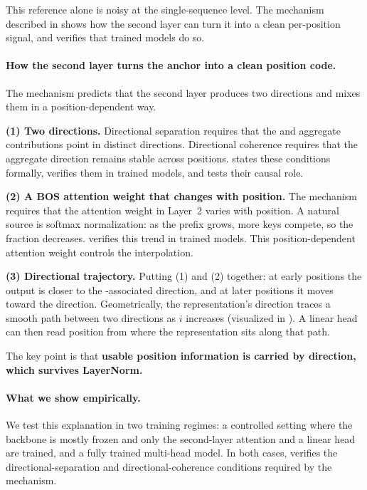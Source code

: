 \documentclass{article}
\theoremstyle{plain}
\theoremstyle{definition}
\theoremstyle{remark}
\begin{document}
This reference alone is noisy at the single-sequence level.
The mechanism described in  shows how the second layer can turn it into a clean per-position signal, and  verifies that trained models do so.

\paragraph{How the second layer turns the anchor into a clean position code.}
The mechanism predicts that the second layer produces two directions and mixes them in a position-dependent way.

\textbf{(1) Two directions.}
Directional separation requires that the \bos and \nbos aggregate contributions point in distinct directions.
Directional coherence requires that the \nbos aggregate direction remains stable across positions.
 states these conditions formally,  verifies them in trained models, and  tests their causal role.

\textbf{(2) A BOS attention weight that changes with position.}
The mechanism requires that the \bos attention weight in Layer~2 varies with position.
A natural source is softmax normalization: as the prefix grows, more keys compete, so the \bos fraction decreases.
 verifies this trend in trained models.
This position-dependent \bos attention weight controls the interpolation.

\textbf{(3) Directional trajectory.}
Putting (1) and (2) together:
at early positions the output is closer to the \bos-associated direction,
and at later positions it moves toward the \nbos direction.
Geometrically, the representation’s direction traces a smooth path between two directions as $i$ increases
(visualized in ).
A linear head can then read position from where the representation sits along that path.

The key point is that \textbf{usable position information is carried by direction, which survives LayerNorm.}

\paragraph{What we show empirically.}
We test this explanation in two training regimes: a controlled setting where the backbone is mostly frozen and only the second-layer attention and a linear head are trained, and a fully trained multi-head model.
In both cases,  verifies the directional-separation and directional-coherence conditions required by the mechanism.
\end{document}
